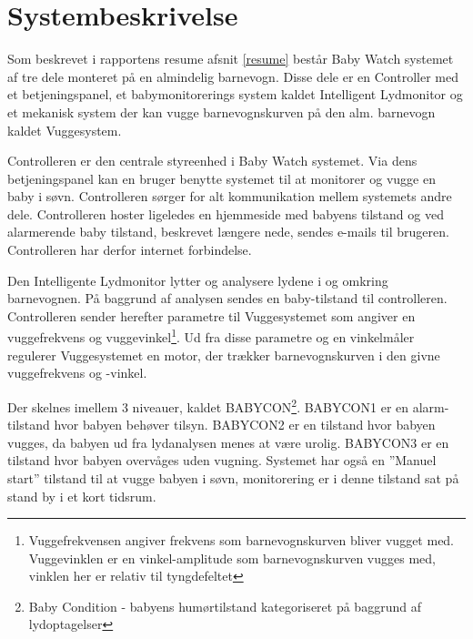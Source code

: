 \chapter{Systembeskrivelse}
Som beskrevet i rapportens resume afsnit \vref{resume} består Baby Watch systemet af tre dele monteret på en almindelig barnevogn. Disse dele er en Controller med et betjeningspanel, et babymonitorerings system kaldet Intelligent Lydmonitor og et mekanisk system der kan vugge barnevognskurven på den alm. barnevogn kaldet Vuggesystem.

Controlleren er den centrale styreenhed i Baby Watch systemet. Via dens betjeningspanel kan en bruger benytte systemet til at monitorer og vugge en baby i søvn. Controlleren sørger for alt kommunikation mellem systemets andre dele. Controlleren hoster ligeledes en hjemmeside med babyens tilstand og ved alarmerende baby tilstand, beskrevet længere nede, sendes e-mails til brugeren. Controlleren har derfor internet forbindelse.

Den Intelligente Lydmonitor lytter og analysere lydene i og omkring barnevognen. På baggrund af analysen sendes en baby-tilstand til controlleren. Controlleren sender herefter parametre til Vuggesystemet som angiver en vuggefrekvens og vuggevinkel\footnote{Vuggefrekvensen angiver frekvens som barnevognskurven bliver vugget med. Vuggevinklen er en vinkel-amplitude som barnevognskurven vugges med, vinklen her er relativ til tyngdefeltet}. Ud fra disse parametre og en vinkelmåler regulerer Vuggesystemet en motor, der trækker barnevognskurven i den givne vuggefrekvens og -vinkel.  

Der skelnes imellem 3 niveauer, kaldet BABYCON\footnote{Baby Condition - babyens humørtilstand kategoriseret på baggrund af lydoptagelser}. BABYCON1 er en alarm-tilstand hvor babyen behøver tilsyn. BABYCON2 er en tilstand hvor babyen vugges, da babyen ud fra lydanalysen menes at være urolig. BABYCON3 er en tilstand hvor babyen overvåges uden vugning. Systemet har også en ''Manuel start'' tilstand til at vugge babyen i søvn, monitorering er i denne tilstand sat på stand by i et kort tidsrum.

